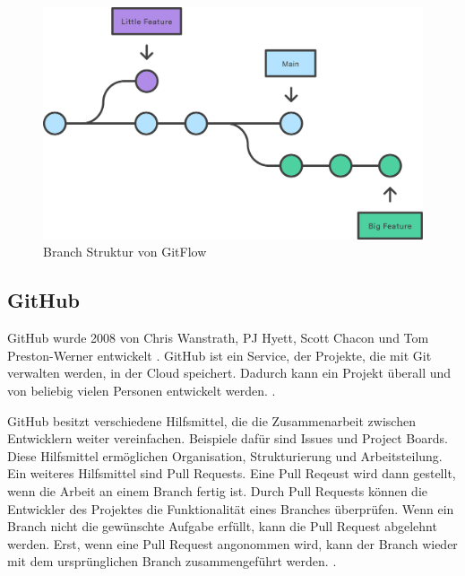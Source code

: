 \newpage
\begin{figure}[!ht]
   \centering
   \includegraphics[width=\textwidth-2cm]{images/theorie/git-branch.png}
   \caption{Branch Struktur von GitFlow \cite{atlassian_git-flow-workflow_nodate}}\label{fig:git-branch}
\end{figure}
 
\subsection{GitHub}\label{sub:t_git_gh}
GitHub wurde 2008 von Chris Wanstrath, PJ Hyett, Scott Chacon und Tom
Preston-Werner entwickelt \cite{noauthor_github_2021}. GitHub ist ein Service,
der Projekte, die mit Git verwalten werden, in der Cloud speichert. Dadurch kann
ein Projekt überall und von beliebig vielen Personen entwickelt werden.
\cite{noauthor_github_2021}.
 
GitHub besitzt verschiedene Hilfsmittel, die die Zusammenarbeit zwischen
Entwicklern weiter vereinfachen. Beispiele dafür sind
\guillemotleft{}Issues\guillemotright{} und \guillemotleft{}Project
Boards\guillemotright{}. Diese Hilfsmittel ermöglichen Organisation,
Strukturierung und Arbeitsteilung. Ein weiteres Hilfsmittel sind Pull Requests.
Eine Pull Reqeust wird dann gestellt, wenn die Arbeit an einem Branch fertig
ist. Durch Pull Requests können die Entwickler des Projektes die Funktionalität
eines Branches überprüfen. Wenn ein Branch nicht die gewünschte Aufgabe erfüllt,
kann die Pull Request abgelehnt werden. Erst, wenn eine Pull Request angonommen
wird, kann der Branch wieder mit dem ursprünglichen Branch zusammengeführt
werden. \cite{atlassian_pull_nodate}.